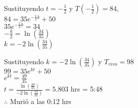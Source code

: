 \begin{center}
Sustituyendo $t = -\frac{1}{2}$ y $T(-\frac{1}{2}) = 84$,\\
\vspace{8pt}
$84 = 35e^{-\frac{1}{2}k} + 50$\\
\vspace{8pt}
$35e^{-\frac{1}{2}k} = 34$\\
\vspace{8pt}
$-\frac{k}{2} = \ln{(\frac{34}{35})}$\\ 
\vspace{8pt}
$k = -2\ln{(\frac{34}{35})}$\\ 
\vspace{12pt}

Sustituyendo $k = -2\ln{(\frac{34}{35})}$ y $T_{vivo} = 98$\\
\vspace{8pt}
$99 = 35e^{kt} + 50$\\ 
\vspace{8pt}
$e^{kt} = \frac{49}{35}$\\ 
\vspace{8pt}
$t = \frac{\ln{(\frac{49}{35})}}{-2\ln{(\frac{34}{35})}} = 5.803$ hrs = 5:48\\ 
\vspace{8pt}
$\therefore$ Murió a las 0:12 hrs
\end{center}
